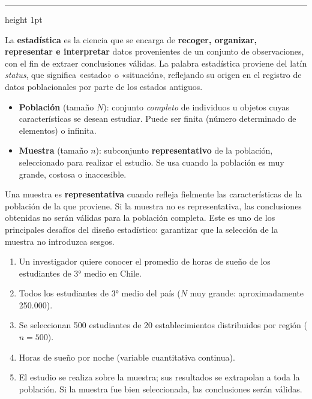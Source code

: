\documentclass[11pt, letterpaper]{article}
\newcommand{\subbloque}[1]{%
  \vspace{14pt}
  \noindent{\large\bfseries\color{zenitnavy} #1}\par
  \vspace{4pt}\hrule height 1pt\vspace{8pt}}
\begin{document}
\subbloque{1.1 Población, muestra y variable}
\label{sub:1.1}

\begin{tcolorbox}[importantbox, title={Definición: Estadística}]
La \textbf{estadística} es la ciencia que se encarga de \textbf{recoger, organizar, representar e interpretar} datos provenientes de un conjunto de observaciones, con el fin de extraer conclusiones válidas. La palabra estadística proviene del latín \textit{status}, que significa «estado» o «situación», reflejando su origen en el registro de datos poblacionales por parte de los estados antiguos.
\end{tcolorbox}

\begin{tcolorbox}[importantbox, title={Definiciones: Población y muestra}]
\begin{itemize}
  \item \textbf{Población} (tamaño $N$): conjunto \textit{completo} de individuos u objetos cuyas características se desean estudiar. Puede ser finita (número determinado de elementos) o infinita.
  \item \textbf{Muestra} (tamaño $n$): subconjunto \textbf{representativo} de la población, seleccionado para realizar el estudio. Se usa cuando la población es muy grande, costosa o inaccesible.
\end{itemize}

\smallskip
Una muestra es \textbf{representativa} cuando refleja fielmente las características de la población de la que proviene. Si la muestra no es representativa, las conclusiones obtenidas no serán válidas para la población completa. Este es uno de los principales desafíos del diseño estadístico: garantizar que la selección de la muestra no introduzca sesgos.
\end{tcolorbox}

\begin{tcolorbox}[examplebox, title={Ej. 1. Población y muestra}]
\begin{enumerate}[label=\textbf{\arabic*.}, leftmargin=2.8cm]
  \item[\textbf{Situación.}] Un investigador quiere conocer el promedio de horas de sueño de los estudiantes de 3° medio en Chile.
  \medskip
  \item[\textbf{Población.}] Todos los estudiantes de 3° medio del país ($N$ muy grande: aproximadamente 250.000).
  \medskip
  \item[\textbf{Muestra.}] Se seleccionan 500 estudiantes de 20 establecimientos distribuidos por región ($n = 500$).
  \medskip
  \item[\textbf{Variable de interés.}] Horas de sueño por noche (variable cuantitativa continua).
  \medskip
  \item[\textbf{Conclusión.}] El estudio se realiza sobre la muestra; sus resultados se extrapolan a toda la población. Si la muestra fue bien seleccionada, las conclusiones serán válidas.
\end{enumerate}
\end{tcolorbox}
\end{document}
